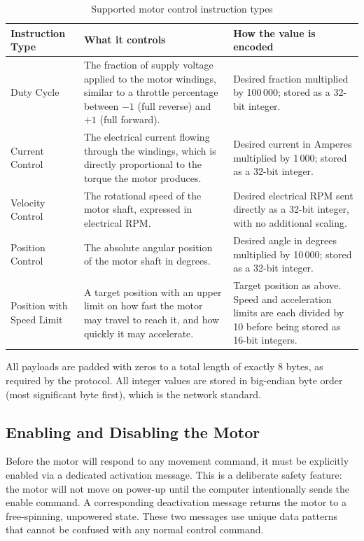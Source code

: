 \documentclass[12pt,a4paper]{article}
\begin{document}
\begin{table}[H]
  \centering
  \caption{Supported motor control instruction types}
  \label{tab:modes}
  \begin{tabular}{p{3.8cm} p{5.0cm} p{4.0cm}}
    \toprule
    Instruction Type & What it controls & How the value is encoded \\
    \midrule
    Duty Cycle
      & The fraction of supply voltage applied to the motor windings,
        similar to a throttle percentage between $-1$ (full
        reverse) and $+1$ (full forward).
      & Desired fraction multiplied by 100\,000;
        stored as a 32-bit integer. \\[6pt]
    Current Control
      & The electrical current flowing through the windings, which
        is directly proportional to the torque the motor produces.
      & Desired current in Amperes multiplied by 1\,000;
        stored as a 32-bit integer. \\[6pt]
    Velocity Control
      & The rotational speed of the motor shaft, expressed in
        electrical RPM.
      & Desired electrical RPM sent directly as a 32-bit integer,
        with no additional scaling. \\[6pt]
    Position Control
      & The absolute angular position of the motor shaft in degrees.
      & Desired angle in degrees multiplied by 10\,000;
        stored as a 32-bit integer. \\[6pt]
    Position with Speed Limit
      & A target position with an upper limit on how fast the motor
        may travel to reach it, and how quickly it may accelerate.
      & Target position as above. Speed and acceleration limits are
        each divided by 10 before being stored as 16-bit integers. \\
    \bottomrule
  \end{tabular}
\end{table}

All payloads are padded with zeros to a total length of exactly 8 bytes,
as required by the protocol. All integer values are stored in big-endian
byte order (most significant byte first), which is the network standard.

\subsection{Enabling and Disabling the Motor}

Before the motor will respond to any movement command, it must be
explicitly enabled via a dedicated activation message. This is a
deliberate safety feature: the motor will not move on power-up until the
computer intentionally sends the enable command. A corresponding
deactivation message returns the motor to a free-spinning, unpowered state.
These two messages use unique data patterns that cannot be confused with
any normal control command.
\end{document}
